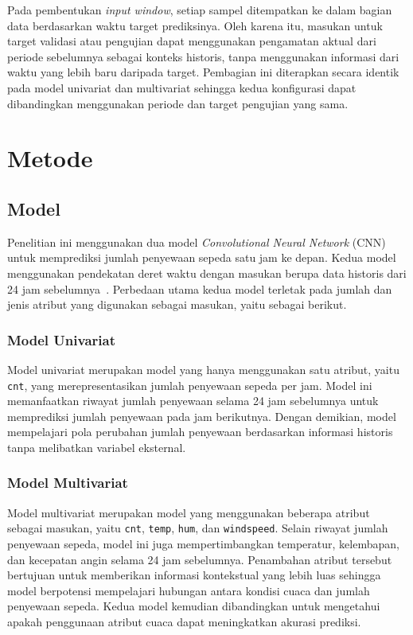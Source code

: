\documentclass[10pt,conference]{IEEEtran}
\begin{document}
Pada pembentukan \textit{input window}, setiap sampel ditempatkan ke dalam bagian data berdasarkan waktu target prediksinya. Oleh karena itu, masukan untuk target validasi atau pengujian dapat menggunakan pengamatan aktual dari periode sebelumnya sebagai konteks historis, tanpa menggunakan informasi dari waktu yang lebih baru daripada target. Pembagian ini diterapkan secara identik pada model univariat dan multivariat sehingga kedua konfigurasi dapat dibandingkan menggunakan periode dan target pengujian yang sama.

\section{Metode}

\subsection{Model}

Penelitian ini menggunakan dua model \textit{Convolutional Neural Network} (CNN) untuk memprediksi jumlah penyewaan sepeda satu jam ke depan. Kedua model menggunakan pendekatan deret waktu dengan masukan berupa data historis dari 24 jam sebelumnya~\cite{repo}. Perbedaan utama kedua model terletak pada jumlah dan jenis atribut yang digunakan sebagai masukan, yaitu sebagai berikut.

\subsubsection{Model Univariat}
\leavevmode\par\nopagebreak

Model univariat merupakan model yang hanya menggunakan satu atribut, yaitu \texttt{cnt}, yang merepresentasikan jumlah penyewaan sepeda per jam. Model ini memanfaatkan riwayat jumlah penyewaan selama 24 jam sebelumnya untuk memprediksi jumlah penyewaan pada jam berikutnya. Dengan demikian, model mempelajari pola perubahan jumlah penyewaan berdasarkan informasi historis tanpa melibatkan variabel eksternal.

\subsubsection{Model Multivariat}
\leavevmode\par\nopagebreak

Model multivariat merupakan model yang menggunakan beberapa atribut sebagai masukan, yaitu \texttt{cnt}, \texttt{temp}, \texttt{hum}, dan \texttt{windspeed}. Selain riwayat jumlah penyewaan sepeda, model ini juga mempertimbangkan temperatur, kelembapan, dan kecepatan angin selama 24 jam sebelumnya. Penambahan atribut tersebut bertujuan untuk memberikan informasi kontekstual yang lebih luas sehingga model berpotensi mempelajari hubungan antara kondisi cuaca dan jumlah penyewaan sepeda. Kedua model kemudian dibandingkan untuk mengetahui apakah penggunaan atribut cuaca dapat meningkatkan akurasi prediksi.
\end{document}
